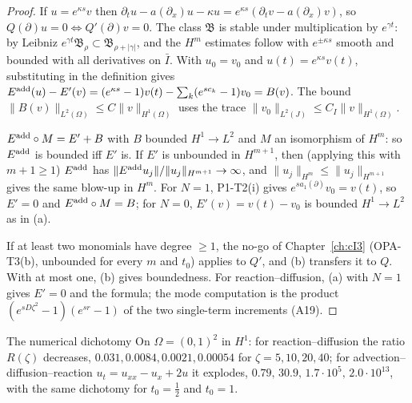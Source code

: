 \begin{proof}
If $u=e^{\kappa s}v$ then $\partial_tu-a(\partial_x)u-\kappa u=e^{\kappa s}(\partial_tv-a(\partial_x)v)$, so $Q(\partial)u=0\iff Q'(\partial)v=0$. The class $\mathfrak B$ is stable under multiplication by $e^{\gamma t}$: by Leibniz $e^{\gamma t}\mathfrak B_\rho\subset\mathfrak B_{\rho+|\gamma|}$, and the $H^m$ estimates follow with $e^{\pm\kappa s}$ smooth and bounded with all derivatives on $\bar I$. With $u_0=v_0$ and $u(t)=e^{\kappa s}v(t)$, substituting in the definition gives $E^{\rm add}(u)-E'(v)=(e^{\kappa s}-1)v(t)-\sum_k(e^{sc_k}-1)v_0=B(v)$. The bound $\|B(v)\|_{L^2(\Omega)}\le C\|v\|_{H^1(\Omega)}$ uses the trace $\|v_0\|_{L^2(J)}\le C_I\|v\|_{H^1(\Omega)}$.

$E^{\rm add}\circ M=E'+B$ with $B$ bounded $H^1\to L^2$ and $M$ an isomorphism of $H^m$: so $E^{\rm add}$ is bounded iff $E'$ is. If $E'$ is unbounded in $H^{m+1}$, then (applying this with $m+1\ge1$) $E^{\rm add}$ has $\|E^{\rm add}u_j\|/\|u_j\|_{H^{m+1}}\to\infty$, and $\|u_j\|_{H^m}\le\|u_j\|_{H^{m+1}}$ gives the same blow-up in $H^m$. For $N=1$, P1-T2(i) gives $e^{sa_1(\partial)}v_0=v(t)$, so $E'=0$ and $E^{\rm add}\circ M=B$; for $N=0$, $E'(v)=v(t)-v_0$ is bounded $H^1\to L^2$ as in (a).

If at least two monomials have degree $\ge1$, the no-go of Chapter~\ref{ch:cI3} (OPA-T3(b), unbounded for every $m$ and $t_0$) applies to $Q'$, and (b) transfers it to $Q$. With at most one, (b) gives boundedness. For reaction--diffusion, (a) with $N=1$ gives $E'=0$ and the formula; the mode computation is the product $(e^{sD\zeta^2}-1)(e^{sr}-1)$ of the two single-term increments (A19).

\end{proof}

\begin{example}{The numerical dichotomy}
On $\Omega=(0,1)^2$ in $H^1$: for reaction--diffusion the ratio $R(\zeta)$ decreases, $0.031,0.0084,0.0021,0.00054$ for $\zeta=5,10,20,40$; for advection--diffusion--reaction $u_t=u_{xx}-u_x+2u$ it explodes, $0.79,\,30.9,\,1.7\cdot10^5,\,2.0\cdot10^{13}$, with the same dichotomy for $t_0=\tfrac12$ and $t_0=1$.
\end{example}


